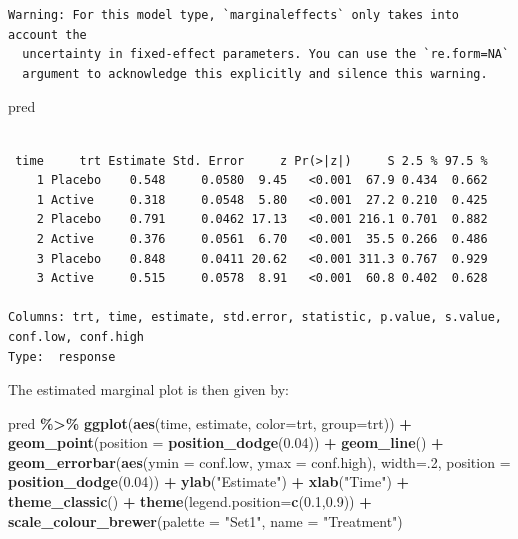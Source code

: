 \documentclass[
]{book}
\newenvironment{Shaded}{\begin{snugshade}}{\end{snugshade}}
\newcommand{\AttributeTok}[1]{\textcolor[rgb]{0.13,0.29,0.53}{#1}}
\newcommand{\DecValTok}[1]{\textcolor[rgb]{0.00,0.00,0.81}{#1}}
\newcommand{\FloatTok}[1]{\textcolor[rgb]{0.00,0.00,0.81}{#1}}
\newcommand{\FunctionTok}[1]{\textcolor[rgb]{0.13,0.29,0.53}{\textbf{#1}}}
\newcommand{\NormalTok}[1]{#1}
\newcommand{\SpecialCharTok}[1]{\textcolor[rgb]{0.81,0.36,0.00}{\textbf{#1}}}
\newcommand{\StringTok}[1]{\textcolor[rgb]{0.31,0.60,0.02}{#1}}
\begin{document}
\begin{verbatim}
Warning: For this model type, `marginaleffects` only takes into account the
  uncertainty in fixed-effect parameters. You can use the `re.form=NA`
  argument to acknowledge this explicitly and silence this warning.
\end{verbatim}

\begin{Shaded}
\begin{Highlighting}[]
\NormalTok{pred}
\end{Highlighting}
\end{Shaded}

\begin{verbatim}

 time     trt Estimate Std. Error     z Pr(>|z|)     S 2.5 % 97.5 %
    1 Placebo    0.548     0.0580  9.45   <0.001  67.9 0.434  0.662
    1 Active     0.318     0.0548  5.80   <0.001  27.2 0.210  0.425
    2 Placebo    0.791     0.0462 17.13   <0.001 216.1 0.701  0.882
    2 Active     0.376     0.0561  6.70   <0.001  35.5 0.266  0.486
    3 Placebo    0.848     0.0411 20.62   <0.001 311.3 0.767  0.929
    3 Active     0.515     0.0578  8.91   <0.001  60.8 0.402  0.628

Columns: trt, time, estimate, std.error, statistic, p.value, s.value, conf.low, conf.high 
Type:  response 
\end{verbatim}

The estimated marginal plot is then given by:

\begin{Shaded}
\begin{Highlighting}[]
\NormalTok{pred }\SpecialCharTok{\%\textgreater{}\%} 
  \FunctionTok{ggplot}\NormalTok{(}\FunctionTok{aes}\NormalTok{(time, estimate, }\AttributeTok{color=}\NormalTok{trt, }\AttributeTok{group=}\NormalTok{trt)) }\SpecialCharTok{+}
  \FunctionTok{geom\_point}\NormalTok{(}\AttributeTok{position =} \FunctionTok{position\_dodge}\NormalTok{(}\FloatTok{0.04}\NormalTok{)) }\SpecialCharTok{+}
  \FunctionTok{geom\_line}\NormalTok{() }\SpecialCharTok{+} 
  \FunctionTok{geom\_errorbar}\NormalTok{(}\FunctionTok{aes}\NormalTok{(}\AttributeTok{ymin =}\NormalTok{ conf.low, }\AttributeTok{ymax =}\NormalTok{ conf.high), }
                \AttributeTok{width=}\NormalTok{.}\DecValTok{2}\NormalTok{,}
                \AttributeTok{position =} \FunctionTok{position\_dodge}\NormalTok{(}\FloatTok{0.04}\NormalTok{)) }\SpecialCharTok{+} 
  \FunctionTok{ylab}\NormalTok{(}\StringTok{"Estimate"}\NormalTok{) }\SpecialCharTok{+}
  \FunctionTok{xlab}\NormalTok{(}\StringTok{"Time"}\NormalTok{) }\SpecialCharTok{+}
  \FunctionTok{theme\_classic}\NormalTok{() }\SpecialCharTok{+} 
  \FunctionTok{theme}\NormalTok{(}\AttributeTok{legend.position=}\FunctionTok{c}\NormalTok{(}\FloatTok{0.1}\NormalTok{,}\FloatTok{0.9}\NormalTok{)) }\SpecialCharTok{+}
  \FunctionTok{scale\_colour\_brewer}\NormalTok{(}\AttributeTok{palette =} \StringTok{"Set1"}\NormalTok{, }\AttributeTok{name =} \StringTok{"Treatment"}\NormalTok{)}
\end{Highlighting}
\end{Shaded}
\end{document}
